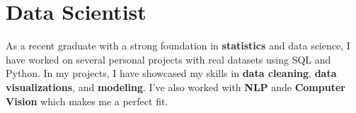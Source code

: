 
\section{Data Scientist}
\small{
    As a recent graduate with a strong foundation in \textbf{statistics} and data science, I have worked on several personal projects with real datasets using SQL and Python. In my projects, I have showcased my skills in \textbf{data cleaning}, \textbf{data visualizations}, and \textbf{modeling}. I've also worked with \textbf{NLP} ande \textbf{Computer Vision} which makes me a perfect fit.
}
